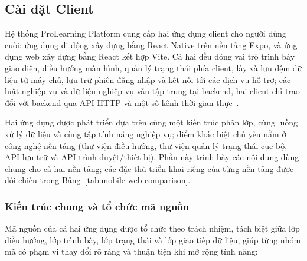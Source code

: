 \subsection{Cài đặt Client}
\label{subsec:frontend-implementation}

Hệ thống ProLearning Platform cung cấp hai ứng dụng client cho người dùng cuối: ứng dụng di động xây dựng bằng React Native trên nền tảng Expo, và ứng dụng web xây dựng bằng React kết hợp Vite. Cả hai đều đóng vai trò trình bày giao diện, điều hướng màn hình, quản lý trạng thái phía client, lấy và lưu đệm dữ liệu từ máy chủ, lưu trữ phiên đăng nhập và kết nối tới các dịch vụ hỗ trợ; các luật nghiệp vụ và dữ liệu nghiệp vụ vẫn tập trung tại backend, hai client chỉ trao đổi với backend qua API HTTP và một số kênh thời gian thực~\cite{reactnativedocs,expodocs,reactdocs,vitedocs}.

Hai ứng dụng được phát triển dựa trên cùng một kiến trúc phân lớp, cùng luồng xử lý dữ liệu và cùng tập tính năng nghiệp vụ; điểm khác biệt chủ yếu nằm ở công nghệ nền tảng (thư viện điều hướng, thư viện quản lý trạng thái cục bộ, API lưu trữ và API trình duyệt/thiết bị). Phần này trình bày các nội dung dùng chung cho cả hai nền tảng; các đặc thù triển khai riêng của từng nền tảng được đối chiếu trong Bảng~\ref{tab:mobile-web-comparison}.

\subsubsection{Kiến trúc chung và tổ chức mã nguồn}
\label{subsubsec:frontend-architecture}

Mã nguồn của cả hai ứng dụng được tổ chức theo trách nhiệm, tách biệt giữa lớp điều hướng, lớp trình bày, lớp trạng thái và lớp giao tiếp dữ liệu, giúp từng nhóm mã có phạm vi thay đổi rõ ràng và thuận tiện khi mở rộng tính năng:

